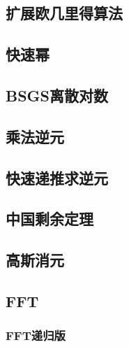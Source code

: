 \documentclass[10pt,a4paper]{article}
\begin{document}
\subsection{扩展欧几里得算法}
\begin{spacing}{1.5}

\end{spacing}

\subsection{快速幂}

\subsection{BSGS离散对数}

\subsection{乘法逆元}
\begin{spacing}{1.5}

\end{spacing}

\subsection{快速递推求逆元}
\begin{spacing}{1.5}

\end{spacing}

\subsection{中国剩余定理}
\begin{spacing}{1.5}

\end{spacing}

\subsection{高斯消元}
\begin{spacing}{1.5}

\end{spacing}

\subsection{FFT}
\subsubsection{FFT递归版}

\end{document}
